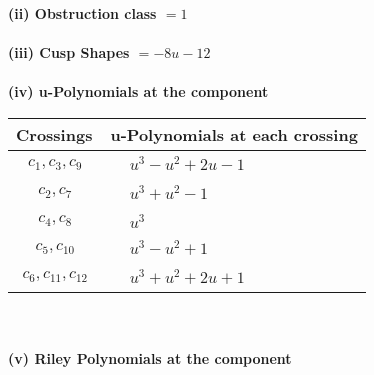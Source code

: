 \documentclass[1p]{elsarticle_modified}
\theoremstyle{definition}
\begin{document}
\flushleft \textbf{(ii) Obstruction class $= 1$}\\~\\
\flushleft \textbf{(iii) Cusp Shapes $= -8 u-12$}\\~\\
\newpage\renewcommand{\arraystretch}{1}
\flushleft \textbf{(iv) u-Polynomials at the component}\newline \\
\begin{tabular}{m{50pt}|m{274pt}}
Crossings & \hspace{64pt}u-Polynomials at each crossing \\
\hline $$\begin{aligned}c_{1},c_{3},c_{9}\end{aligned}$$&$\begin{aligned}
&u^3- u^2+2 u-1
\end{aligned}$\\
\hline $$\begin{aligned}c_{2},c_{7}\end{aligned}$$&$\begin{aligned}
&u^3+u^2-1
\end{aligned}$\\
\hline $$\begin{aligned}c_{4},c_{8}\end{aligned}$$&$\begin{aligned}
&u^3
\end{aligned}$\\
\hline $$\begin{aligned}c_{5},c_{10}\end{aligned}$$&$\begin{aligned}
&u^3- u^2+1
\end{aligned}$\\
\hline $$\begin{aligned}c_{6},c_{11},c_{12}\end{aligned}$$&$\begin{aligned}
&u^3+u^2+2 u+1
\end{aligned}$\\
\hline
\end{tabular}\\~\\
\newpage\renewcommand{\arraystretch}{1}
\flushleft \textbf{(v) Riley Polynomials at the component}\newline \\
\end{document}
